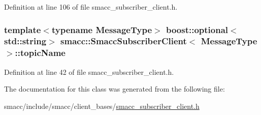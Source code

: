 Definition at line 106 of file smacc\+\_\+subscriber\+\_\+client.\+h.

\subsubsection[{\texorpdfstring{topic\+Name}{topicName}}]{\setlength{\rightskip}{0pt plus 5cm}template$<$typename Message\+Type$>$ boost\+::optional$<$std\+::string$>$ {\bf smacc\+::\+Smacc\+Subscriber\+Client}$<$ Message\+Type $>$\+::topic\+Name}\hypertarget{classsmacc_1_1SmaccSubscriberClient_ac062907e834aa8e4ca7964fe2035edf7}{}\label{classsmacc_1_1SmaccSubscriberClient_ac062907e834aa8e4ca7964fe2035edf7}


Definition at line 42 of file smacc\+\_\+subscriber\+\_\+client.\+h.



The documentation for this class was generated from the following file\+:\begin{DoxyCompactItemize}
\item 
smacc/include/smacc/client\+\_\+bases/\hyperlink{smacc__subscriber__client_8h}{smacc\+\_\+subscriber\+\_\+client.\+h}\end{DoxyCompactItemize}
